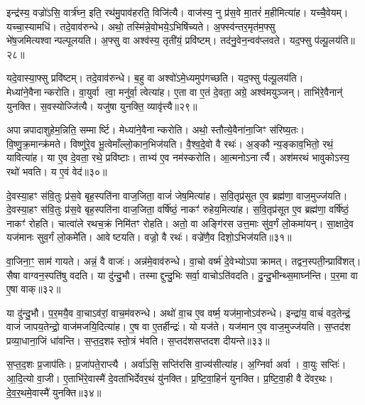 इन्द्र॑स्य॒ वज्रो॑ऽसि॒ वार्त्र॑घ्न॒ इति॒ रथ॑मु॒पाव॑हरति॒ विजि॑त्यै।
वाज॑स्य॒ नु प्र॑स॒वे मा॒तरं॑ म॒हीमित्या॑ह।
यच्चै॒वेयम्।
यच्चा॒स्यामधि॑।
तदे॒वाव॑रुन्धे।
अथो॒ तस्मि॑न्ने॒वोभये॒\-ऽभि\-षि॑च्यते।
अ॒फ्स्व॑न्तर॒मृत॑म॒फ्सु भे॑ष॒जमित्यश्वान्पल्पूलयति।
अ॒फ्सु वा अश्व॑स्य॒ तृती॑यं॒ प्रवि॑ष्टम्।
तद॑नु॒वेन॒न्वव॑प्लवते।
यद॒फ्सु प॑ल्पू॒लय॑ति॥२८॥

यदे॒वास्या॒फ्सु प्रवि॑ष्टम्।
तदे॒वाव॑रुन्धे।
ब॒हु वा अश्वो॑\-ऽमे॒ध्यमुप॑\-गच्छति।
यद॒फ्सु प॑ल्पू॒लय॑ति।
मेध्या॑ने॒वै\-नान्करोति।
वा॒युर्वा त्वा॒ मनु॑र्वा॒ त्वेत्या॑ह।
ए॒ता वा ए॒तं दे॒वता॒ अग्रे॒ अश्व॑मयुञ्जन्।
ताभि॑रे॒वैनान्॑ युनक्ति।
स॒वस्योज्जि॑त्यै।
यजु॑षा युनक्ति॒ व्यावृ॑त्त्यै॥२९॥

अपान्नपादाशुहेम॒न्निति॒ सम्मार्ष्टि।
मेध्या॑ने॒वैनान्करोति।
अथो॒ स्तौत्ये॒वैना॑ना॒जिꣳ स॑रिष्य॒तः।
वि॒ष्णु॒क्र॒मान्क्र॑मते।
विष्णु॑रे॒व भू॒त्वेमाँल्लो॒कान॒भिज॑यति।
वै॒श्व॒दे॒वो वै रथः॑।
अ॒ङ्कौ न्य॒ङ्काव॒भितो॒ रथं॒ यावित्या॑ह।
या ए॒व दे॒वता॒ रथे॒ प्रवि॑ष्टाः।
ताभ्य॑ ए॒व नम॑स्करोति।
आ॒त्मनो\-ऽनार्त्यै।
अश॑मरथं भावुको\-ऽस्य॒ रथो॑ भवति।
य ए॒वं वेद॑॥३०॥\anuvakamend[स्व॒द॒य॒ति॒ प॒ल्पू॒लय॑ति॒ व्यावृ॑त्त्या॒ अनार्त्यै॒ द्वे च॑]

दे॒वस्या॒हꣳ स॑वि॒तुः प्र॑स॒वे बृह॒स्पति॑ना वाज॒जिता॒ वाजं॑ जेष॒मित्या॑ह।
स॒वि॒तृप्र॑सूत ए॒व ब्रह्म॑णा॒ वाज॒मुज्ज॑यति।
दे॒वस्या॒हꣳ स॑वि॒तुः प्र॑स॒वे बृह॒स्पति॑ना वाज॒जिता॒ वर्\mbox{}षि॑ष्ठं॒ नाकꣳ॑ रुहेय॒मित्या॑ह।
स॒वि॒तृप्र॑सूत ए॒व ब्रह्म॑णा॒ वर्\mbox{}षि॑ष्ठं॒ नाकꣳ॑ रोहति।
चात्वा॑ले रथच॒क्रं निमि॑तꣳ रोहति।
अतो॒ वा अङ्गि॑रस उत्त॒माः सु॑व॒र्गं लो॒कमा॑यन्।
सा॒क्षादे॒व यज॑मानः सुव॒र्गं लो॒कमे॑ति।
आवेष्टयति।
वज्रो॒ वै रथः॑।
वज्रे॑णै॒व दिशो॒\-ऽभिज॑यति॥३१॥

वा॒जिना॒ꣳ॒ साम॑ गायते।
अन्नं॒ वै वाजः॑।
अन्न॑मे॒वाव॑रुन्धे।
वा॒चो वर्ष्म॑ दे॒वेभ्यो\-ऽपाक्रामत्।
तद्वन॒स्पती॒न्प्रावि॑शत्।
सैषा वाग्वन॒स्पति॑षु वदति।
या दु॑न्दु॒भौ।
तस्माद्दुन्दु॒भिः सर्वा॒ वाचो\-ऽति॑वदति।
दु॒न्दु॒भीन्थ्स॒माघ्न॑न्ति।
प॒र॒मा वा ए॒षा वाक्॥३२॥

या दु॑न्दु॒भौ।
प॒र॒मयै॒व वा॒चा\-ऽव॑रां॒ वाच॒म॑वरुन्धे।
अथो॑ वा॒च ए॒व वर्ष्म॒ यज॑मा॒नो\-ऽव॑रुन्धे।
इन्द्रा॑य॒ वाचं॑ वद॒तेन्द्रं॒ वाजं॑ जापय॒तेन्द्रो॒ वाज॑मजयि॒दित्या॑ह।
ए॒ष वा ए॒तर्\mbox{}हीन्द्रः॑।
यो यज॑ते।
यज॑मान ए॒व वाज॒मुज्ज॑यति।
स॒प्तद॑श प्रव्या॒धाना॒जिं धा॑वन्ति।
स॒प्त॒द॒शꣴ स्तो॒त्रं भ॑वति।
स॒प्तद॑शसप्तदश दीयन्ते॥३३॥

स॒प्त॒द॒शः प्र॒जाप॑तिः।
प्र॒जा॑पते॒राप्त्यै।
अर्वा॑ऽसि॒ सप्ति॑रसि वा॒ज्य॑सीत्या॑ह।
अ॒ग्निर्वा अर्वा।
वा॒युः सप्तिः॑।
आ॒दि॒त्यो वा॒जी।
ए॒ताभि॑रे॒वास्मै॑ दे॒वता॑भिर्देवर॒थं यु॑नक्ति।
प्र॒ष्टि॒वा॒हिनं॑ युनक्ति।
प्र॒ष्टि॒वा॒ही वै दे॑वर॒थः।
दे॒व॒र॒थमे॒वास्मै॑ युनक्ति॥३४॥

